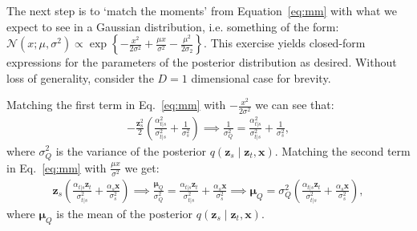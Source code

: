 The next step is to `match the moments' from Equation~\eqref{eq:mm} with what we expect to see in a Gaussian distribution, i.e. something of the form: $\mathcal{N}\left(x;\mu, \sigma^2 \right)\propto \exp\left\{- \frac{x^2}{2\sigma^2} + \frac{\mu x}{\sigma^2} - \frac{\mu^2}{2\sigma_2}
 \right\}$. This exercise yields closed-form expressions for the parameters of the posterior distribution as desired. Without loss of generality, consider the $D=1$ dimensional case for brevity.
  
 Matching the first term in Eq.~\eqref{eq:mm} with $-\frac{x^2}{2\sigma^2}$ we can see that:
%
\begin{align}
    -\frac{\mathbf{z}_s^2}{2}\left(\frac{\alpha_{t|s}^2}{\sigma_{t|s}^2} + \frac{1}{\sigma_s^2}\right) \implies \frac{1}{\sigma^2_Q} = \frac{\alpha_{t|s}^2}{\sigma_{t|s}^2} + \frac{1}{\sigma_s^2},
\end{align}
%
where $\sigma^2_Q$ is the variance of the posterior $q(\mathbf{z}_s \mid \mathbf{z}_t, \mathbf{x})$. Matching the second term in Eq.~\eqref{eq:mm} with $\frac{\mu x}{\sigma^2}$ we get:
%
\begin{align}
    \mathbf{z}_s\left(\frac{\alpha_{t|s}\mathbf{z}_t}{\sigma_{t|s}^2} + \frac{\alpha_s\mathbf{x}}{\sigma_s^2}\right) \implies \frac{\boldsymbol{\mu}_Q}{\sigma^2_Q} = \frac{\alpha_{t|s}\mathbf{z}_t}{\sigma_{t|s}^2} + \frac{\alpha_s\mathbf{x}}{\sigma_s^2} \implies \boldsymbol{\mu}_Q = {\sigma^2_Q} \left(\frac{\alpha_{t|s}\mathbf{z}_t}{\sigma_{t|s}^2} + \frac{\alpha_s\mathbf{x}}{\sigma_s^2}\right),
\end{align}
where $\boldsymbol{\mu}_Q$ is the mean of the posterior $q(\mathbf{z}_s \mid \mathbf{z}_t, \mathbf{x})$. 

